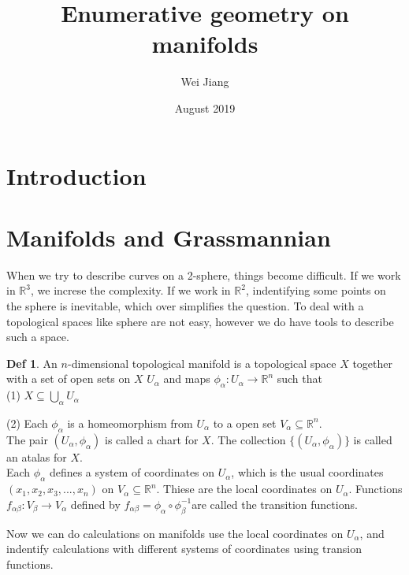 \documentclass{article}
\title{Enumerative geometry on manifolds}
\author{Wei Jiang}
\date{August 2019}
\begin{document}
\theoremstyle{definition}
\newtheorem{df}{Def}[section]
\newtheorem{eg}[df]{Eg}
\newtheorem{thm}[df]{Thm}


\tableofcontents
\newpage

\section{Introduction}

\newpage
\section{Manifolds and Grassmannian}
 

When we try to describe curves on a 2-sphere, things become difficult. If we 
work in $\mathbb{R}^{3}$, we increse the complexity. If we work in $\mathbb{R}^{2}$,
indentifying some points on the sphere is inevitable, which over simplifies 
the question. To deal with a topological spaces like sphere are not easy, however 
we do have tools to describe such a space.

\begin{df}
An $n$-dimensional topological manifold is a topological space $X$ 
together with a set of open sets on $X$ ${U_{\alpha}}$ 
and maps $\phi_{\alpha} : U_{\alpha} \longrightarrow \mathbb{R}^{n} $
such that \\

(1) $X \subseteq \bigcup_{\alpha} U_{\alpha} $

(2) Each $\phi_{\alpha}$ is a homeomorphism from $U_{\alpha}$ to a open set 
$V_{\alpha} \subseteq \mathbb{R}^{n} $. \\

The pair $(U_{\alpha},\phi_{\alpha})$ is called a chart for $X$. The collection 
$\{(U_{\alpha},\phi_{\alpha})\}$ is called an atalas for $X$. \\

Each $\phi_{\alpha}$ defines a system of coordinates on $U_{\alpha}$, which is
the usual coordinates $(x_{1},x_{2},x_{3},...,x_{n})$ on 
$V_{\alpha} \subseteq \mathbb{R}^{n}$. Thiese are the local coordinates on $U_{\alpha}$.
Functions $f_{\alpha\beta} : V_{\beta}\longrightarrow V_{\alpha}$ defined by 
$f_{\alpha\beta} = \phi_{\alpha} \circ \phi_{\beta}^{-1}$are called the transition
 functions.

\end{df}

Now we can do calculations on manifolds use the local coordinates on $U_{\alpha}$, 
and indentify calculations with different systems of coordinates using transion functions.
\end{document}
